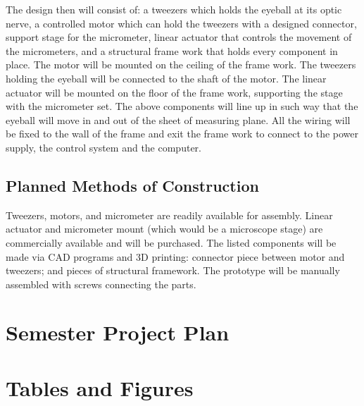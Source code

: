 \documentclass{article}
\begin{document}
The design then will consist of: a tweezers which holds the eyeball at its optic nerve, a controlled motor which can hold the tweezers with a designed connector, support stage for the micrometer, linear actuator that controls the movement of the micrometers, and a structural frame work that holds every component in place. The motor will be mounted on the ceiling of the frame work. The tweezers holding the eyeball will be connected to the shaft of the motor. The linear actuator will be mounted on the floor of the frame work, supporting the stage with the micrometer set. The above components will line up in such way that the eyeball will move in and out of the sheet of measuring plane. All the wiring will be fixed to the wall of the frame and exit the frame work to connect to the power supply, the control system and the computer.

\subsection{Planned Methods of Construction}
Tweezers, motors, and micrometer are readily available for assembly. Linear actuator and micrometer mount (which would be a microscope stage) are commercially available and will be purchased. The listed components will be made via CAD programs and 3D printing: connector piece between motor and tweezers; and pieces of structural framework. The prototype will be manually assembled with screws connecting the parts.

\section{Semester Project Plan}

\section{Tables and Figures}
\end{document}
